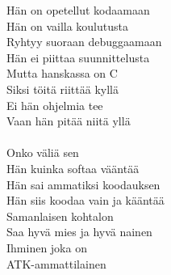 
Hän on opetellut kodaamaan  \\ Hän on vailla koulutusta  \\ Ryhtyy suoraan debuggaamaan  \\ Hän ei piittaa suunnittelusta  \\ Mutta hanskassa on C  \\ Siksi töitä riittää kyllä  \\ Ei hän ohjelmia tee  \\ Vaan hän pitää niitä yllä  \\ \hspace{10mm} \\ Onko väliä sen \\ Hän kuinka softaa vääntää \\ Hän sai ammatiksi koodauksen \\ Hän siis koodaa vain ja kääntää \\ Samanlaisen kohtalon \\ Saa hyvä mies ja hyvä nainen \\ Ihminen joka on \\ ATK-ammattilainen